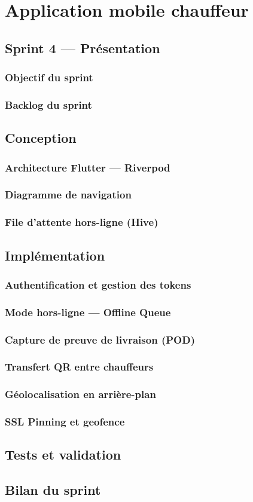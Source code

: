 \chapter{Application mobile chauffeur}

\section{Sprint 4 — Présentation}

\subsection{Objectif du sprint}
\subsection{Backlog du sprint}

\section{Conception}

\subsection{Architecture Flutter — Riverpod}
\subsection{Diagramme de navigation}
\subsection{File d'attente hors-ligne (Hive)}

\section{Implémentation}

\subsection{Authentification et gestion des tokens}
\subsection{Mode hors-ligne — Offline Queue}
\subsection{Capture de preuve de livraison (POD)}
\subsection{Transfert QR entre chauffeurs}
\subsection{Géolocalisation en arrière-plan}
\subsection{SSL Pinning et geofence}

\section{Tests et validation}

\section*{Bilan du sprint}

